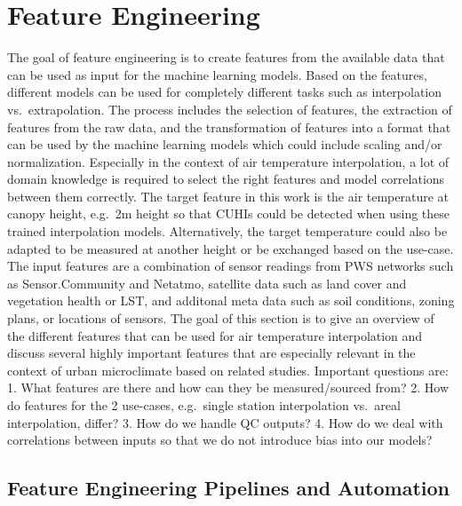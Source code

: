 \section{Feature Engineering}
\label{sec:feature_engineering}

The goal of feature engineering is to create features from the available data that can be used as input for the machine learning models. Based on the features, different models can be used for completely different tasks such as interpolation vs.\ extrapolation. The process includes the selection of features, the extraction of features from the raw data, and the transformation of features into a format that can be used by the machine learning models which could include scaling and/or normalization. Especially in the context of air temperature interpolation, a lot of domain knowledge is required to select the right features and model correlations between them correctly. The target feature in this work is the air temperature at canopy height, e.g.\ 2m height so that CUHIs could be detected when using these trained interpolation models. Alternatively, the target temperature could also be adapted to be measured at another height or be exchanged based on the use-case.\\
The input features are a combination of sensor readings from PWS networks such as Sensor.Community and Netatmo, satellite data such as land cover and vegetation health or LST, and additonal meta data such as soil conditions, zoning plans, or locations of sensors. The goal of this section is to give an overview of the different features that can be used for air temperature interpolation and discuss several highly important features that are especially relevant in the context of urban microclimate based on related studies. Important questions are: 1. What features are there and how can they be measured/sourced from? 2. How do features for the 2 use-cases, e.g.\ single station interpolation vs.\ areal interpolation, differ? 3. How do we handle QC outputs? 4. How do we deal with correlations between inputs so that we do not introduce bias into our models?

\subsection{Feature Engineering Pipelines and Automation}

